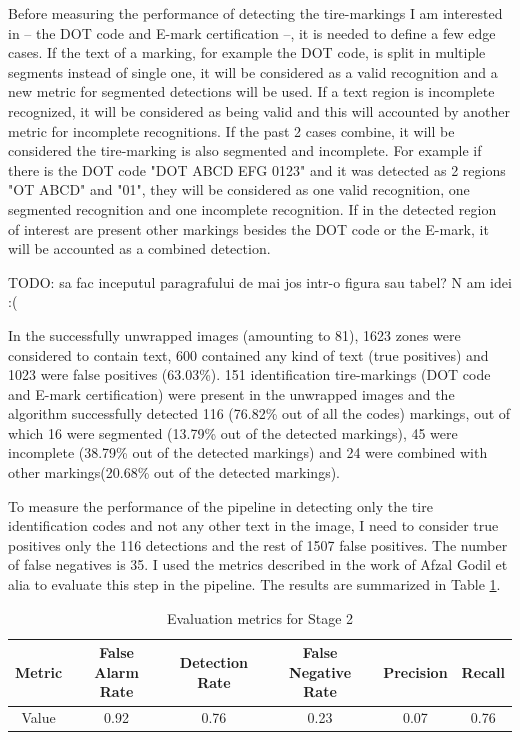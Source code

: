 Before measuring the performance of detecting the tire-markings I am interested in -- the DOT code and E-mark certification --, it is needed to define a few edge cases. If the text of a marking, for example the DOT code, is split in multiple segments instead of single one, it will be considered as a valid recognition and a new metric for segmented detections will be used. If a text region is incomplete recognized, it will be considered as being valid and this will accounted by another metric for incomplete recognitions. If the past 2 cases combine, it will be considered the tire-marking is also segmented and incomplete. For example if there is the DOT code "DOT ABCD EFG 0123" and it was detected as 2 regions "OT ABCD" and "01", they will be considered as one valid recognition, one segmented recognition and one incomplete recognition. If in the detected region of interest are present other markings besides the DOT code or the E-mark, it will be accounted as a combined detection.

TODO: sa fac inceputul paragrafului de mai jos intr-o figura sau tabel? N am idei :(

In the successfully unwrapped images (amounting to 81), 1623 zones were considered to contain text, 600 contained any kind of text (true positives) and 1023 were false positives (63.03\%). 151 identification tire-markings (DOT code and E-mark certification) were present in the unwrapped images and the algorithm successfully detected 116 (76.82\% out of all the codes) markings, out of which 16 were segmented (13.79\% out of the detected markings), 45 were incomplete (38.79\% out of the detected markings) and 24 were combined with other markings(20.68\% out of the detected markings).

To measure the performance of the pipeline in detecting only the tire identification codes and not any other text in the image, I need to consider true positives only the 116 detections and the rest of 1507 false positives. The number of false negatives is 35. I used the metrics described in the work of Afzal Godil et alia \cite{article:evaluation-metrics} to evaluate this step in the pipeline. The results are summarized in Table \ref{tab:evaluation_metrics-stage2}.

\begin{table}
    \begin{tabular}{|c|c|c|c|c|c|}
    \hline
    Metric & False Alarm Rate & Detection Rate & False Negative Rate & Precision & Recall \\ \hline
    Value  & 0.92             & 0.76           & 0.23                & 0.07      & 0.76   \\ \hline
    \end{tabular}
    \caption{Evaluation metrics for Stage 2}
    \label{tab:evaluation_metrics-stage2}
\end{table}


